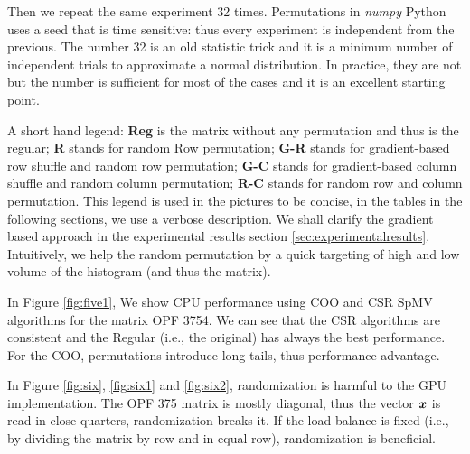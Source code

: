 \documentclass[manuscript,screen]{acmart}
\begin{document}
Then we repeat the same experiment 32 times. Permutations in {\em
  numpy} Python uses a seed that is time sensitive: thus every
experiment is independent from the previous. The number 32 is an old
statistic trick and it is a minimum number of independent trials to
approximate a normal distribution. In practice, they are not but the
number is sufficient for most of the cases and it is an excellent
starting point.

A short hand legend: {\bf Reg} is the matrix without any permutation
and thus is the regular; {\bf R} stands for random Row permutation;
{\bf G-R} stands for gradient-based row shuffle and random row
permutation; {\bf G-C} stands for gradient-based column shuffle and
random column permutation; {\bf R-C} stands for random row and column
permutation.  This legend is used in the pictures to be concise, in
the tables in the following sections, we use a verbose description. We
shall clarify the gradient based approach in the experimental results
section \ref{sec:experimentalresults}. Intuitively, we help the random
permutation by a quick targeting of high and low volume of the
histogram (and thus the matrix).


In Figure \ref{fig:five1}, We show CPU performance using COO and CSR
SpMV algorithms for the matrix OPF 3754. We can see that the CSR
algorithms are consistent and the Regular (i.e., the original) has
always the best performance. For the COO, permutations introduce long
tails, thus performance advantage. 

In Figure \ref{fig:six}, \ref{fig:six1} and \ref{fig:six2},
randomization is harmful to the GPU implementation. The OPF 375 matrix
is mostly diagonal, thus the vector ${\boldsymbol x}$ is read in close
quarters, randomization breaks it.  If the load balance is fixed
(i.e., by dividing the matrix by row and in equal row), randomization
is beneficial.

\end{document}
